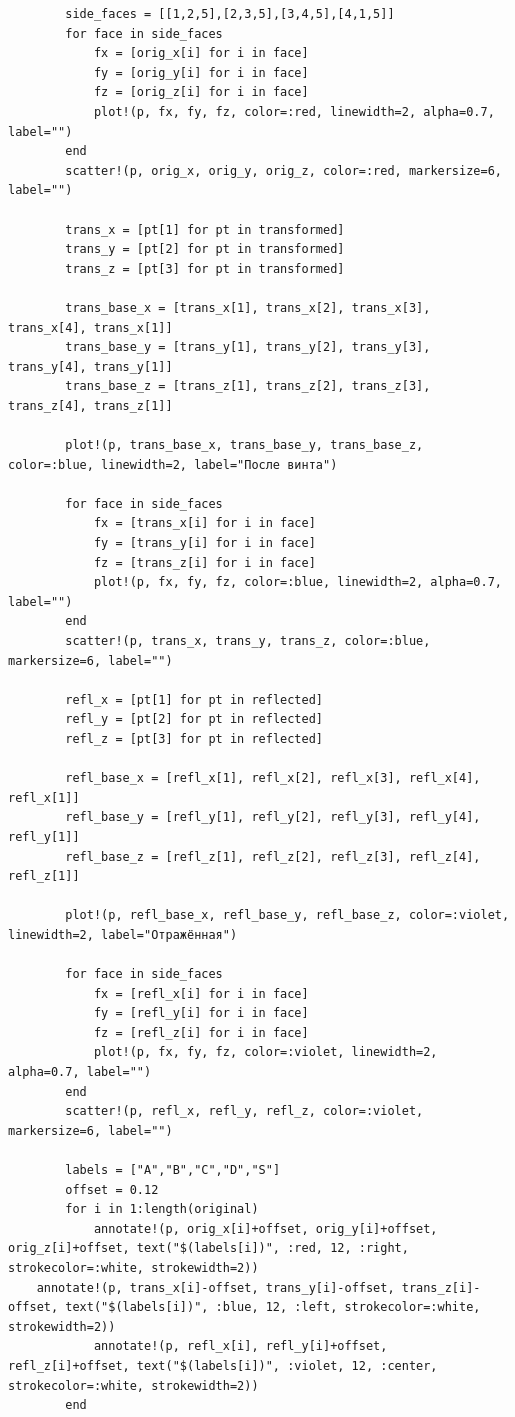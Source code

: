 \begin{verbatim}
        side_faces = [[1,2,5],[2,3,5],[3,4,5],[4,1,5]]
        for face in side_faces
            fx = [orig_x[i] for i in face]
            fy = [orig_y[i] for i in face]
            fz = [orig_z[i] for i in face]
            plot!(p, fx, fy, fz, color=:red, linewidth=2, alpha=0.7, label="")
        end
        scatter!(p, orig_x, orig_y, orig_z, color=:red, markersize=6, label="")

        trans_x = [pt[1] for pt in transformed]
        trans_y = [pt[2] for pt in transformed]
        trans_z = [pt[3] for pt in transformed]

        trans_base_x = [trans_x[1], trans_x[2], trans_x[3], trans_x[4], trans_x[1]]
        trans_base_y = [trans_y[1], trans_y[2], trans_y[3], trans_y[4], trans_y[1]]
        trans_base_z = [trans_z[1], trans_z[2], trans_z[3], trans_z[4], trans_z[1]]

        plot!(p, trans_base_x, trans_base_y, trans_base_z, color=:blue, linewidth=2, label="После винта")

        for face in side_faces
            fx = [trans_x[i] for i in face]
            fy = [trans_y[i] for i in face]
            fz = [trans_z[i] for i in face]
            plot!(p, fx, fy, fz, color=:blue, linewidth=2, alpha=0.7, label="")
        end
        scatter!(p, trans_x, trans_y, trans_z, color=:blue, markersize=6, label="")

        refl_x = [pt[1] for pt in reflected]
        refl_y = [pt[2] for pt in reflected]
        refl_z = [pt[3] for pt in reflected]

        refl_base_x = [refl_x[1], refl_x[2], refl_x[3], refl_x[4], refl_x[1]]
        refl_base_y = [refl_y[1], refl_y[2], refl_y[3], refl_y[4], refl_y[1]]
        refl_base_z = [refl_z[1], refl_z[2], refl_z[3], refl_z[4], refl_z[1]]

        plot!(p, refl_base_x, refl_base_y, refl_base_z, color=:violet, linewidth=2, label="Отражённая")

        for face in side_faces
            fx = [refl_x[i] for i in face]
            fy = [refl_y[i] for i in face]
            fz = [refl_z[i] for i in face]
            plot!(p, fx, fy, fz, color=:violet, linewidth=2, alpha=0.7, label="")
        end
        scatter!(p, refl_x, refl_y, refl_z, color=:violet, markersize=6, label="")

        labels = ["A","B","C","D","S"]
        offset = 0.12
        for i in 1:length(original)
            annotate!(p, orig_x[i]+offset, orig_y[i]+offset, orig_z[i]+offset, text("$(labels[i])", :red, 12, :right, strokecolor=:white, strokewidth=2))
    annotate!(p, trans_x[i]-offset, trans_y[i]-offset, trans_z[i]-offset, text("$(labels[i])", :blue, 12, :left, strokecolor=:white, strokewidth=2))
            annotate!(p, refl_x[i], refl_y[i]+offset, refl_z[i]+offset, text("$(labels[i])", :violet, 12, :center, strokecolor=:white, strokewidth=2))
        end


\end{verbatim}
